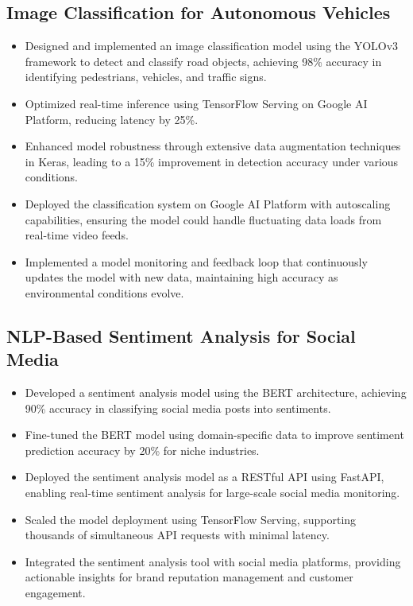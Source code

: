 \documentclass[12pt,a4paper]{article}
\begin{document}
\subsection*{Image Classification for Autonomous Vehicles}
\begin{itemize}[leftmargin=*,noitemsep,topsep=0pt]
\item Designed and implemented an image classification model using the YOLOv3 framework to detect and classify road objects, achieving 98\% accuracy in identifying pedestrians, vehicles, and traffic signs.
\item Optimized real-time inference using TensorFlow Serving on Google AI Platform, reducing latency by 25\%.
\item Enhanced model robustness through extensive data augmentation techniques in Keras, leading to a 15\% improvement in detection accuracy under various conditions.
\item Deployed the classification system on Google AI Platform with autoscaling capabilities, ensuring the model could handle fluctuating data loads from real-time video feeds.
\item Implemented a model monitoring and feedback loop that continuously updates the model with new data, maintaining high accuracy as environmental conditions evolve.
\end{itemize}

\subsection*{NLP-Based Sentiment Analysis for Social Media}
\begin{itemize}[leftmargin=*,noitemsep,topsep=0pt]
\item Developed a sentiment analysis model using the BERT architecture, achieving 90\% accuracy in classifying social media posts into sentiments.
\item Fine-tuned the BERT model using domain-specific data to improve sentiment prediction accuracy by 20\% for niche industries.
\item Deployed the sentiment analysis model as a RESTful API using FastAPI, enabling real-time sentiment analysis for large-scale social media monitoring.
\item Scaled the model deployment using TensorFlow Serving, supporting thousands of simultaneous API requests with minimal latency.
\item Integrated the sentiment analysis tool with social media platforms, providing actionable insights for brand reputation management and customer engagement.
\end{itemize}
\end{document}

